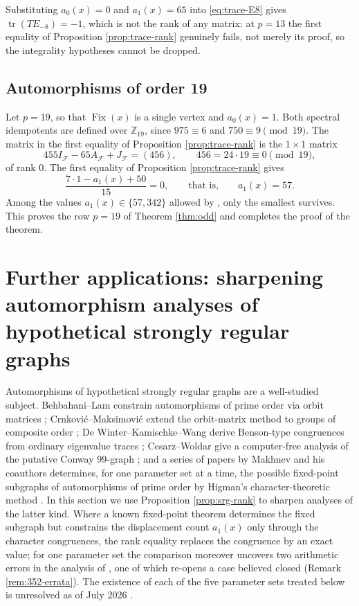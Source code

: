\documentclass[11pt]{article}
\theoremstyle{plain}
\theoremstyle{remark}
\newcommand{\Fix}{\operatorname{Fix}}
\newcommand{\tr}{\operatorname{tr}}
\begin{document}
Substituting $a_0(x)=0$ and $a_1(x)=65$ into \eqref{eq:trace-E8} gives $\tr(TE_{-8})=-1$,
which is not the rank of any matrix: at $p=13$ the first equality of Proposition \ref{prop:trace-rank} genuinely fails,
not merely its proof, so the integrality hypotheses cannot be dropped.

\subsection{Automorphisms of order 19}\label{subsec:order19}

Let $p=19$, so that $\Fix(x)$ is a single vertex and $a_0(x)=1$.
Both spectral idempotents are defined over $\mathbb Z_{19}$, since $975\equiv 6$ and $750\equiv 9\pmod{19}$.
The matrix in the first equality of Proposition \ref{prop:trace-rank} is the $1\times 1$ matrix
\[
 455I_{\mathcal F}-65A_{\mathcal F}+J_{\mathcal F}=(456),
 \qquad
 456=24\cdot 19\equiv 0\pmod{19},
\]
of rank $0$.  The first equality of Proposition \ref{prop:trace-rank} gives
\[
 \frac{7\cdot 1-a_1(x)+50}{15}=0,
 \qquad\text{that is,}\qquad
 a_1(x)=57.
\]
Among the values $a_1(x)\in\{57,342\}$ allowed by \cite[Lemma 12]{MacajSiran}, only the smallest survives.
This proves the row $p=19$ of Theorem \ref{thm:odd} and completes the proof of the theorem.


\section{Further applications: sharpening automorphism analyses of hypothetical strongly regular graphs}\label{sec:applications}

Automorphisms of hypothetical strongly regular graphs are a well-studied subject.
Behbahani--Lam constrain automorphisms of prime order via orbit matrices \cite{BehbahaniLam};
Crnkovi\'c--Maksimovi\'c extend the orbit-matrix method to groups of composite order \cite{CrnkovicMaksimovic};
De Winter--Kamischke--Wang derive Benson-type congruences from ordinary eigenvalue traces \cite{DeWinterKamischkeWang};
Cesarz--Woldar give a computer-free analysis of the putative Conway $99$-graph \cite{CesarzWoldar};
and a series of papers by Makhnev and his coauthors determines,
for one parameter set at a time,
the possible fixed-point subgraphs of automorphisms of prime order by Higman's character-theoretic method \cite{MakhnevMinakova,MakhnevNosov2004,MakhnevNosov,MakhnevNirova,Nosov2016}.
In this section we use Proposition \ref{prop:srg-rank} to sharpen analyses of the latter kind.
Where a known fixed-point theorem determines the fixed subgraph but constrains the displacement count $a_1(x)$ only through the character congruences,
the rank equality replaces the congruence by an exact value;
for one parameter set the comparison moreover uncovers two arithmetic errors in the analysis of \cite{MakhnevNosov2004},
one of which re-opens a case believed closed (Remark \ref{rem:352-errata}).
The existence of each of the five parameter sets treated below is unresolved as of July 2026 \cite{BrouwerSRGTable,BrouwerVanMaldeghem}.
\end{document}
